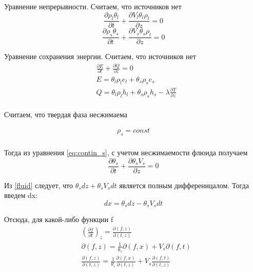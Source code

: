 \documentclass[12pt]{article}
\newcommand{\pd}[2]{\frac{\partial #1}{\partial #2}}
\begin{document}
Уравнение непрерывности. Считаем, что источников нет
\begin{equation}
\pd{\rho_l\theta_l}{t} + \pd{V_l\theta_l\rho_l}{z} =0
\label{eq:contin_l}
\end{equation}
\begin{equation}
\pd{\rho_s\theta_s}{t} + \pd{V_s\theta_s\rho_l}{z} =0
\label{eq:contin_s}
\end{equation}

Уравнение сохранения энергии. Считаем, что источников нет
\begin{equation}
\begin{aligned}
&\pd{E}{t} + \pd{Q}{z} =0 \\
&E=\theta_l\rho_l e_l + \theta_s\rho_s e_s \\
&Q=\theta_l\rho_l h_l + \theta_s\rho_s h_s - \lambda \pd{T}{z}\\
\label{eq:conserv}
\end{aligned}
\end{equation}

Считаем, что твердая фаза несжимаема

\begin{equation}
\begin{aligned}
\rho_s = const \\
\label{rho_const}
\end{aligned}
\end{equation}

Тогда из уравнения \eqref{eq:contin_s}, с учетом несжимаемости флюида получаем
\begin{equation}
\pd{\theta_s}{t} + \pd{\theta_s V_s}{z} = 0
\label{fluid}
\end{equation}

Из \eqref{fluid} следует, что $\theta_s dz + \theta_s V_s dt $ является полным дифференицалом. Тогда введем dx:
\begin{equation}
dx = \theta_s dz - \theta_s V_s dt
\label{dx_dz}
\end{equation}

Отсюда, для какой-либо функции f 
\begin{equation}
\begin{aligned}
&\left(\pd{f}{t}\right)_z = \pd{(f , z)}{(t , z)}\\
&\partial(f , z) = \frac{1}{\theta_s}\partial(f , x) + V_s \partial(f , t)\\
&\pd{(f , z)}{(t , z)} = \frac{1}{\theta_s}\pd{(f , x)}{(t , z)} + V_s\pd{(f , t)}{(t , z)}\\
\end{aligned}
\label{help1}
\end{equation}
\end{document}
